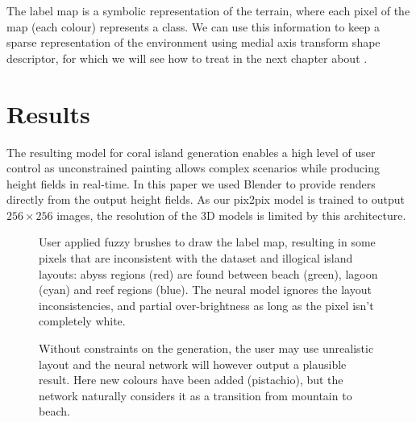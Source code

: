 The label map is a symbolic representation of the terrain, where each pixel of the map (each colour) represents a class. We can use this information to keep a sparse representation of the environment using medial axis transform shape descriptor, for which we will see how to treat in the next chapter about .


\section{Results}
\label{sec:coral-island-results}

The resulting model for coral island generation enables a high level of user control as unconstrained painting allows complex scenarios while producing height fields in real-time. In this paper we used Blender to provide renders directly from the output height fields. As our pix2pix model is trained to output $256\times256$ images, the resolution of the 3D models is limited by this architecture.

\begin{figure}
    \caption{User applied fuzzy brushes to draw the label map, resulting in some pixels that are inconsistent with the dataset and illogical island layouts: abyss regions (red) are found between beach (green), lagoon (cyan) and reef regions (blue). The neural model ignores the layout inconsistencies, and partial over-brightness as long as the pixel isn't completely white.}
    \label{fig:coral-island-results-fuzzy}
\end{figure}
\begin{figure}
    \caption{Without constraints on the generation, the user may use unrealistic layout and the neural network will however output a plausible result. Here new colours have been added (pistachio), but the network naturally considers it as a transition from mountain to beach.}
    \label{fig:coral-island-results_dino}
\end{figure}


